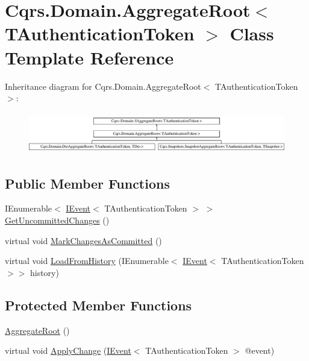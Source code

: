 \hypertarget{classCqrs_1_1Domain_1_1AggregateRoot}{}\section{Cqrs.\+Domain.\+Aggregate\+Root$<$ T\+Authentication\+Token $>$ Class Template Reference}
\label{classCqrs_1_1Domain_1_1AggregateRoot}
Inheritance diagram for Cqrs.\+Domain.\+Aggregate\+Root$<$ T\+Authentication\+Token $>$\+:\begin{figure}[H]
\begin{center}
\leavevmode
\includegraphics[height=1.822126cm]{classCqrs_1_1Domain_1_1AggregateRoot}
\end{center}
\end{figure}
\subsection*{Public Member Functions}
\begin{DoxyCompactItemize}
\item 
I\+Enumerable$<$ \hyperlink{interfaceCqrs_1_1Events_1_1IEvent}{I\+Event}$<$ T\+Authentication\+Token $>$ $>$ \hyperlink{classCqrs_1_1Domain_1_1AggregateRoot_a625e885ec7885a686f729ed1efe3a8fa}{Get\+Uncommitted\+Changes} ()
\item 
virtual void \hyperlink{classCqrs_1_1Domain_1_1AggregateRoot_adab968b830e186cb832583910bf6f3a6}{Mark\+Changes\+As\+Committed} ()
\item 
virtual void \hyperlink{classCqrs_1_1Domain_1_1AggregateRoot_aec873ad6e4c98309cad2d9f1c534aebb}{Load\+From\+History} (I\+Enumerable$<$ \hyperlink{interfaceCqrs_1_1Events_1_1IEvent}{I\+Event}$<$ T\+Authentication\+Token $>$$>$ history)
\end{DoxyCompactItemize}
\subsection*{Protected Member Functions}
\begin{DoxyCompactItemize}
\item 
\hyperlink{classCqrs_1_1Domain_1_1AggregateRoot_a1db2322dd7442e1e0c3c07332124eb2f}{Aggregate\+Root} ()
\item 
virtual void \hyperlink{classCqrs_1_1Domain_1_1AggregateRoot_a7e299b13c7556731e52670aa6d782296}{Apply\+Change} (\hyperlink{interfaceCqrs_1_1Events_1_1IEvent}{I\+Event}$<$ T\+Authentication\+Token $>$ @event)
\end{DoxyCompactItemize}

